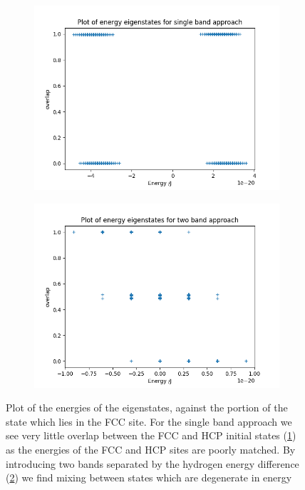 \begin{figure}[htbp]
    \centering
    \begin{subfigure}{0.45\linewidth}
        \includegraphics[width=0.9\linewidth]{Figures/Simulation/single band eigenstate energies.png}
        \label{fig:one band overlap}
    \end{subfigure}
    \hfill
    \begin{subfigure}{0.45\linewidth}
        \includegraphics[width=0.9\linewidth]{Figures/Simulation/two band eigenstate energies.png}
        \label{fig:two band overlap}
    \end{subfigure}
    \caption{Plot of the energies of the
        eigenstates, against the portion of the
        state which lies in the FCC site.
        For the single band approach we
        see very little overlap between the FCC and HCP
        initial states (\cref{fig:one band overlap})
        as the energies of the FCC and HCP sites
        are poorly matched. By introducing
        two bands separated by the hydrogen energy
        difference (\cref{fig:two band overlap})
        we find mixing between states which are
        degenerate in energy
    }\label{fig:overlap with hydrogen energies}
\end{figure}


